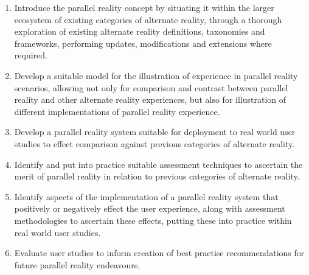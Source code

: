 \begin{enumerate}
	\item Introduce the parallel reality concept by situating it within the larger ecosystem of existing categories of alternate reality, through a thorough exploration of existing alternate reality definitions, taxonomies and frameworks, performing updates, modifications and extensions where required.
	
	\item Develop a suitable model for the illustration of experience in parallel reality scenarios, allowing not only for comparison and contrast between parallel reality and other alternate reality experiences, but also for illustration of different implementations of parallel reality experience.
	
	\item Develop a parallel reality system suitable for deployment to real world user studies to effect comparison against previous categories of alternate reality.
	
	\item Identify and put into practice suitable assessment techniques to ascertain the merit of parallel reality in relation to previous categories of alternate reality.
	
	\item Identify aspects of the implementation of a parallel reality system that positively or negatively effect the user experience, along with assessment methodologies to ascertain these effects, putting these into practice within real world user studies.

	\item Evaluate user studies to inform creation of best practise recommendations for future parallel reality endeavours.
	
\end{enumerate}


